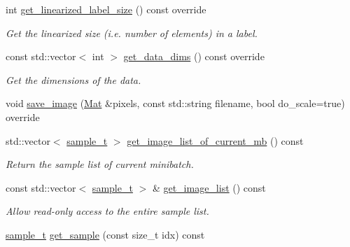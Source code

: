 \begin{DoxyCompactItemize}
int \hyperlink{classlbann_1_1image__data__reader_adb62b193a10b2b12c1bf183ea9c2095e}{get\+\_\+linearized\+\_\+label\+\_\+size} () const override
\begin{DoxyCompactList}\small\item\em Get the linearized size (i.\+e. number of elements) in a label. \end{DoxyCompactList}\item 
const std\+::vector$<$ int $>$ \hyperlink{classlbann_1_1image__data__reader_a1bb05018e059afae76d46a2a908dd75c}{get\+\_\+data\+\_\+dims} () const override
\begin{DoxyCompactList}\small\item\em Get the dimensions of the data. \end{DoxyCompactList}\item 
void \hyperlink{classlbann_1_1image__data__reader_a71e4fa1eb8212cce88a2ed408ceeac51}{save\+\_\+image} (\hyperlink{base_8hpp_a68f11fdc31b62516cb310831bbe54d73}{Mat} \&pixels, const std\+::string filename, bool do\+\_\+scale=true) override
\item 
std\+::vector$<$ \hyperlink{classlbann_1_1image__data__reader_a7580011ef6ef9da32e1a3bc49ad0706c}{sample\+\_\+t} $>$ \hyperlink{classlbann_1_1image__data__reader_a9624d37e076cf71154b65910dd7e1195}{get\+\_\+image\+\_\+list\+\_\+of\+\_\+current\+\_\+mb} () const
\begin{DoxyCompactList}\small\item\em Return the sample list of current minibatch. \end{DoxyCompactList}\item 
const std\+::vector$<$ \hyperlink{classlbann_1_1image__data__reader_a7580011ef6ef9da32e1a3bc49ad0706c}{sample\+\_\+t} $>$ \& \hyperlink{classlbann_1_1image__data__reader_aa03599a5f66d498d4bb90c50ae70c82a}{get\+\_\+image\+\_\+list} () const
\begin{DoxyCompactList}\small\item\em Allow read-\/only access to the entire sample list. \end{DoxyCompactList}\item 
\hyperlink{classlbann_1_1image__data__reader_a7580011ef6ef9da32e1a3bc49ad0706c}{sample\+\_\+t} \hyperlink{classlbann_1_1image__data__reader_ae3f4a0b018e8212a42cbbfbd2b514bf4}{get\+\_\+sample} (const size\+\_\+t idx) const
\end{DoxyCompactItemize}
